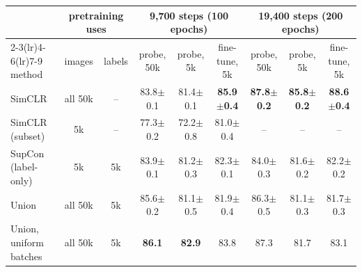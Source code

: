 \begin{tabular}{l cc ccc ccc}
\toprule
 & \multicolumn{2}{c}{pretraining uses} & \multicolumn{3}{c}{9,700 steps (100 epochs)} & \multicolumn{3}{c}{19,400 steps (200 epochs)} \\
\cmidrule(lr){2-3}\cmidrule(lr){4-6}\cmidrule(lr){7-9}
method & images & labels & probe, 50k & probe, 5k & fine-tune, 5k & probe, 50k & probe, 5k & fine-tune, 5k \\
\midrule
SimCLR & all 50k & -- & 83.8{\scriptsize$\pm$0.1} & 81.4{\scriptsize$\pm$0.1} & \textbf{85.9{\scriptsize$\pm$0.4}} & \textbf{87.8{\scriptsize$\pm$0.2}} & \textbf{85.8{\scriptsize$\pm$0.2}} & \textbf{88.6{\scriptsize$\pm$0.4}} \\
SimCLR (subset) & 5k & -- & 77.3{\scriptsize$\pm$0.2} & 72.2{\scriptsize$\pm$0.8} & 81.0{\scriptsize$\pm$0.4} & -- & -- & -- \\
SupCon (label-only) & 5k & 5k & 83.9{\scriptsize$\pm$0.1} & 81.2{\scriptsize$\pm$0.3} & 82.3{\scriptsize$\pm$0.1} & 84.0{\scriptsize$\pm$0.3} & 81.6{\scriptsize$\pm$0.2} & 82.2{\scriptsize$\pm$0.2} \\
Union & all 50k & 5k & 85.6{\scriptsize$\pm$0.2} & 81.1{\scriptsize$\pm$0.5} & 81.9{\scriptsize$\pm$0.4} & 86.3{\scriptsize$\pm$0.5} & 81.1{\scriptsize$\pm$0.3} & 81.7{\scriptsize$\pm$0.3} \\
Union, uniform batches & all 50k & 5k & \textbf{86.1} & \textbf{82.9} & 83.8 & 87.3 & 81.7 & 83.1 \\
\bottomrule
\end{tabular}
